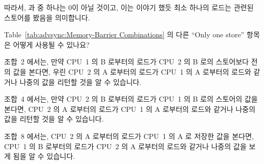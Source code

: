 \begin{enumerate}
	따라서,  과  중 하나는 0이 아닐 것이고, 이는 이야기 했듯
	최소 하나의 로드는 관련된 스토어를 봤음을 의미합니다.

\QuickQ{}
	Table~\ref{tab:advsync:Memory-Barrier Combinations} 의 다른 ``Only one
	store'' 항목은 어떻게 사용될 수 있나요?

\QuickA{}
	조합~2 에서는, 만약 CPU~1 의 B 로부터의 로드가 CPU~2 의 B 로의
	스토어보다 전의 값을 본다면, 우린 CPU~2 의 A 로부터의 로드가 CPU~1 의 A
	로부터의 로드와 같거나 나중의 값을 리턴할 것을 알 수 있습니다.

	조합~4 에서는, 만약 CPU~2 의 B 로부터의 로드가 CPU~1 의 B 로의 스토어의
	값을 본다면, CPU~2 의 A 로부터의 로드가 CPU~1 의 A 로부터의 로드와
	같거나 나중의 값을 리턴할 것을 알 수 있습니다.

	조합~8 에서는, CPU~2 의 A 로부터의 로드가 CPU~1 의 A 로 저장한 값을
	본다면, CPU~1 의 B 로부터의 로드가 CPU~2 의 A 로부터의 로드와 같거나
	나중의 값을 보게 됨을 알 수 있습니다.

\end{enumerate}
